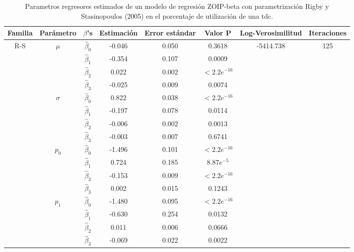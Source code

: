 \begin{table}[!hbt]
{\scriptsize
\begin{center}
\begin{tabular}{|c|c|c|ccc|c|c|}\hline
Familia & Par\'{a}metro & $\beta$'s & Estimaci\'{o}n & Error est\'{a}ndar & Valor P & Log-Verosimilitud & Iteraciones \\ \hline \hline
\multirow{12}{*}{R-S} & \multirow{4}{*}{$\mu$} & $\hat{\beta}_0$ & -0.046	&0.050	&0.3618 & \multirow{12}{*}{-5414.738} & \multirow{12}{*}{125}  \\
& & $\hat{\beta}_1$ & -0.354	&0.107	&0.0009 & &\\
& & $\hat{\beta}_2$ & 0.022	&0.002	&$<2.2e^{-16}$ & & \\
& & $\hat{\beta}_3$ & -0.025	&0.009	&0.0074 & & \\ \cline{2-6}
& \multirow{4}{*}{$\sigma$} & $\hat{\beta}_0$ & 0.822	&0.038	&$<2.2e^{-16}$  & &\\
& & $\hat{\beta}_1$ & -0.197	&0.078	&0.0114  & &\\
& & $\hat{\beta}_2$ & -0.006	&0.002	&0.0013  & &\\
& & $\hat{\beta}_3$ & -0.003	&0.007	&0.6741  & &\\ \cline{2-6}
& \multirow{4}{*}{$p_0$} & $\hat{\beta}_0$ & -1.496	&0.101	&$<2.2e^{-16}$  & &\\
& & $\hat{\beta}_1$ & 0.724	&0.185	&$8.87e^{-5}$  & &\\
& & $\hat{\beta}_2$ & -0.153	&0.009	&$<2.2e^{-16}$  & &\\
& & $\hat{\beta}_3$ & 0.002	&0.015	&0.1243  & &\\ \cline{2-6}
& \multirow{4}{*}{$p_1$} & $\hat{\beta}_0$ &-1.480	&0.095	&$<2.2e^{-16}$  & &\\
& & $\hat{\beta}_1$ & -0.630	&0.254	&0.0132  & &\\
& & $\hat{\beta}_2$ & 0.011	&0.006	&0.0666  & &\\
& & $\hat{\beta}_3$ & -0.069	&0.022	&0.0022  & &\\ \hline

\end{tabular}
\caption{Parametros regresores estimados de un modelo de regresi\'{o}n ZOIP-beta con parametrizaci\'{o}n Rigby y Stasinopoulos (2005) en el porcentaje de utilizaci\'{o}n de una tdc.}
\label{T_Apli_CC_RS}
\end{center}
}
\end{table}


